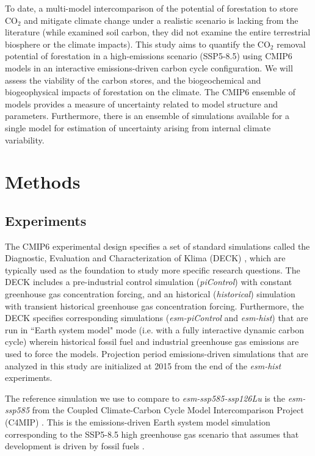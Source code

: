 \documentclass[draft]{agujournal2019}
\begin{document}
To date, a multi-model intercomparison of the potential of forestation to store CO$_2$ and mitigate climate change under a realistic scenario is lacking from the literature (while  examined soil carbon, they did not examine the entire terrestrial biosphere or the climate impacts).
This study aims to quantify the CO$_2$ removal potential of forestation  in a high-emissions scenario (SSP5-8.5) using CMIP6 models in an interactive emissions-driven carbon cycle configuration.
We will assess the viability of the carbon stores, and the biogeochemical and biogeophysical impacts of forestation on the climate.
The CMIP6 ensemble of models provides a measure of uncertainty related to model structure and parameters.
Furthermore, there is an ensemble of simulations available for a single model for estimation of uncertainty arising from internal climate variability. 

\section{Methods}

\subsection{Experiments}

The CMIP6 experimental design specifies a set of standard simulations called the Diagnostic, Evaluation and Characterization of Klima (DECK) \cite{eyring_overview_2016}, which are typically used as the foundation to study more specific research questions.
The DECK includes a pre-industrial control simulation (\textit{piControl}) with constant greenhouse gas concentration forcing, and an historical (\textit{historical}) simulation with transient historical greenhouse gas concentration forcing.
Furthermore, the DECK specifies corresponding simulations (\textit{esm-piControl} and \textit{esm-hist}) that are run in ``Earth system model" mode (i.e. with a fully interactive dynamic carbon cycle) wherein historical fossil fuel and industrial greenhouse gas emissions are used to force the models.
Projection period emissions-driven simulations that are analyzed in this study are initialized at 2015 from the end of the \textit{esm-hist} experiments.

The reference simulation we use to compare to \textit{esm-ssp585-ssp126Lu} is the \textit{esm-ssp585} from the Coupled Climate-Carbon Cycle Model Intercomparison Project (C4MIP) \cite{jones_c4mip_2016}.
This is the emissions-driven Earth system model simulation corresponding to the SSP5-8.5 high greenhouse gas scenario that assumes that development is driven by fossil fuels \cite{oneill_scenario_2016}.
\end{document}
